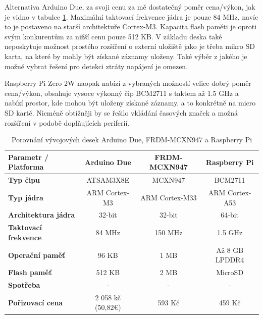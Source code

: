 Alternativa Arduino Due, za svoji cenu za mě dostatečný poměr cena/výkon, jak je vidno v tabulce \ref{tab:board-comparison}. Maximální taktovací frekvence jádra je pouze 84 MHz, navíc to je postaveno na starší architektuře Cortex-M3. Kapacita flash paměti je oproti svým konkurentům za nižší cenu pouze 512 KB. V základu deska také neposkytuje možnost prostého rozšíření o externí uložiště jako je třeba mikro SD karta, na které by mohly být získané záznamy uloženy. Také výběr z jakého je možné vybrat řešení pro detekci ztráty napájení je omezen.

Raspberry Pi Zero 2W naopak nabízí z vybraných možností velice dobrý poměr cena/výkon, obsahuje vysoce výkonný čip BCM2711 s taktem až 1.5 GHz a nabízí prostor, kde mohou být uloženy získané záznamy, a to konkrétně na micro SD kartě. Nicméně obtížněji by se řešilo vkládání časových značek a možná rozšíření v podobě doplňujících periferií.

\begin{table}[h]
    \centering
    \renewcommand{\arraystretch}{1.2}
    \begin{adjustbox}{max width=\textwidth} %
    \begin{tabular}{|l|c|c|c|}
        \hline
        \textbf{Parametr / Platforma}   & \textbf{Arduino Due}  & \textbf{FRDM-MCXN947} & \textbf{Raspberry Pi} \\ 
        \hline
        \textbf{Typ čipu}               & ATSAM3X8E             & MCXN947               & BCM2711               \\ 
        \hline
        \textbf{Typ jádra}              & ARM Cortex-M3         & ARM Cortex-M33        & ARM Cortex-A53        \\ 
        \hline
        \textbf{Architektura jádra}     & 32-bit                & 32-bit                & 64-bit                \\ 
        \hline
        \textbf{Taktovací frekvence}    & 84 MHz                & 150 MHz               & 1.5 GHz               \\ 
        \hline
        \textbf{Operační paměť}         & 96 KB                 & 1 MB                  & Až 8 GB LPDDR4        \\ 
        \hline
        \textbf{Flash paměť}            & 512 KB                & 2 MB                  & MicroSD               \\ 
        \hline
        \textbf{Spotřeba }              & -                     & -                     & -                     \\ 
        \hline
        \textbf{Pořizovací cena}        & 2 058 kč (50,82€)                    & 593 Kč                & 459 Kč  \\ 
        \hline
    \end{tabular}
    \end{adjustbox}
    \caption{Porovnání vývojových desek Arduino Due, FRDM-MCXN947 a Raspberry Pi}
    \label{tab:board-comparison}
\end{table}

